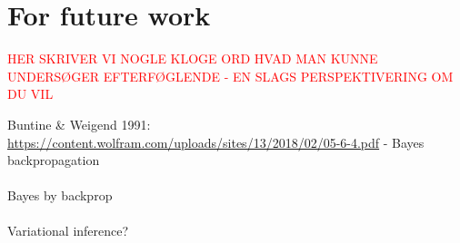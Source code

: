 \chapter{For future work}
\textcolor{red}{HER SKRIVER VI NOGLE KLOGE ORD HVAD MAN KUNNE UNDERSØGER EFTERFØGLENDE - EN SLAGS PERSPEKTIVERING OM DU VIL}

Buntine \& Weigend 1991: \url{https://content.wolfram.com/uploads/sites/13/2018/02/05-6-4.pdf} - Bayes backpropagation
\\
\\
Bayes by backprop
\\
\\
Variational inference?